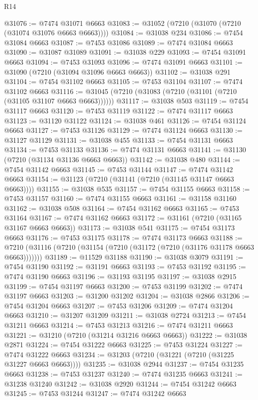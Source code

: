 \begin{lexlean}{R14}
\begin{coremodule}
@31076 := @7474 @31071 @6663
@31083 := @31052 (@7210 (@31070 (@7210 (@31074 @31076 @6663 @6663))))
@31084 := @31038 @234
@31086 := @7454 @31084 @6663
@31087 := @7453 @31086
@31089 := @7474 @31084 @6663
@31090 := @31087 @31089
@31091 := @31038 @229
@31093 := @7454 @31091 @6663
@31094 := @7453 @31093
@31096 := @7474 @31091 @6663
@31101 := @31090 (@7210 (@31094 @31096 @6663 @6663))
@31102 := @31038 @291
@31104 := @7454 @31102 @6663
@31105 := @7453 @31104
@31107 := @7474 @31102 @6663
@31116 := @31045 (@7210 (@31083 (@7210 (@31101 (@7210 (@31105 @31107 @6663 @6663))))))
@31117 := @31038 @503
@31119 := @7454 @31117 @6663
@31120 := @7453 @31119
@31122 := @7474 @31117 @6663
@31123 := @31120 @31122
@31124 := @31038 @461
@31126 := @7454 @31124 @6663
@31127 := @7453 @31126
@31129 := @7474 @31124 @6663
@31130 := @31127 @31129
@31131 := @31038 @455
@31133 := @7454 @31131 @6663
@31134 := @7453 @31133
@31136 := @7474 @31131 @6663
@31141 := @31130 (@7210 (@31134 @31136 @6663 @6663))
@31142 := @31038 @480
@31144 := @7454 @31142 @6663
@31145 := @7453 @31144
@31147 := @7474 @31142 @6663
@31154 := @31123 (@7210 (@31141 (@7210 (@31145 @31147 @6663 @6663))))
@31155 := @31038 @535
@31157 := @7454 @31155 @6663
@31158 := @7453 @31157
@31160 := @7474 @31155 @6663
@31161 := @31158 @31160
@31162 := @31038 @508
@31164 := @7454 @31162 @6663
@31165 := @7453 @31164
@31167 := @7474 @31162 @6663
@31172 := @31161 (@7210 (@31165 @31167 @6663 @6663))
@31173 := @31038 @541
@31175 := @7454 @31173 @6663
@31176 := @7453 @31175
@31178 := @7474 @31173 @6663
@31188 := @7210 (@31116 (@7210 (@31154 (@7210 (@31172 (@7210 (@31176 @31178 @6663 @6663)))))))
@31189 := @11529 @31188
@31190 := @31038 @3079
@31191 := @7454 @31190
@31192 := @31191 @6663
@31193 := @7453 @31192
@31195 := @7474 @31190 @6663
@31196 := @31193 @31195
@31197 := @31038 @2915
@31199 := @7454 @31197 @6663
@31200 := @7453 @31199
@31202 := @7474 @31197 @6663
@31203 := @31200 @31202
@31204 := @31038 @2866
@31206 := @7454 @31204 @6663
@31207 := @7453 @31206
@31209 := @7474 @31204 @6663
@31210 := @31207 @31209
@31211 := @31038 @2724
@31213 := @7454 @31211 @6663
@31214 := @7453 @31213
@31216 := @7474 @31211 @6663
@31221 := @31210 (@7210 (@31214 @31216 @6663 @6663))
@31222 := @31038 @2871
@31224 := @7454 @31222 @6663
@31225 := @7453 @31224
@31227 := @7474 @31222 @6663
@31234 := @31203 (@7210 (@31221 (@7210 (@31225 @31227 @6663 @6663))))
@31235 := @31038 @2944
@31237 := @7454 @31235 @6663
@31238 := @7453 @31237
@31240 := @7474 @31235 @6663
@31241 := @31238 @31240
@31242 := @31038 @2920
@31244 := @7454 @31242 @6663
@31245 := @7453 @31244
@31247 := @7474 @31242 @6663

\end{coremodule}
\end{lexlean}
